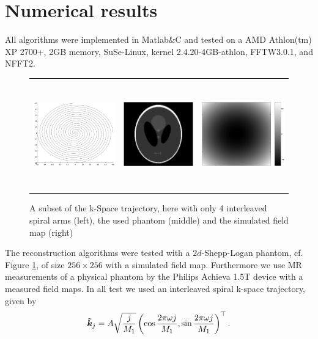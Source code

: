 \documentclass[journal]{IEEEtran}
\newcommand{\zb}[1]{\mbox{\boldmath{${#1}$}}}
\numberwithin{equation}{section}
\numberwithin{table}{section}
\numberwithin{figure}{section}
\begin{document}
\section{Numerical results}\label{Sec:Num}
All algorithms were implemented in Matlab\&C and tested on a AMD Athlon(tm) XP
2700+, 2GB memory, SuSe-Linux, kernel 2.4.20-4GB-athlon, FFTW3.0.1, and NFFT2.


\begin{figure}[ht] 
\centering
\begin{tabular}{ccc}
\includegraphics[height=4.7cm]{pics/spiral.jpg} &
\includegraphics[height=4.7cm]{pics/phantom_original.jpg} &
\includegraphics[height=4.7cm]{pics/fieldmap_simulated.jpg}
\end{tabular}
\caption{A subset of the k-Space trajectory, here with only 4
  interleaved spiral arms (left), the used phantom (middle) and the
  simulated field map (right)} 
\label{Fig:Phantom}
\end{figure}

The reconstruction algorithms were tested with a $2d$-Shepp-Logan
phantom, cf. Figure \ref{Fig:Phantom}, of size $256\times256$ with a
simulated field map. Furthermore we use MR measurements of a physical
phantom by the Philips Achieva 1.5T device with a measured field
maps. In all test we used an interleaved spiral k-space trajectory,
given by 
\begin{equation*}
\zb {\tilde k}_j = A \sqrt{\frac{j}{M_1}} \left(\cos\frac{2\pi \omega
    j}{M_1}, \sin\frac{2\pi \omega j}{M_1}\right)^{\top}. 
\end{equation*}
\end{document}
